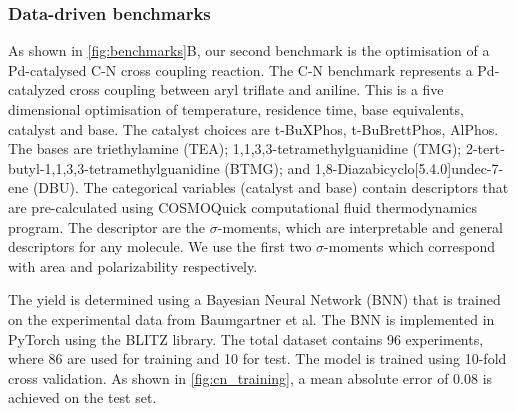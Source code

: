 
 
\subsubsection{Data-driven benchmarks}


As shown in \ref{fig:benchmarks}B, our second benchmark is the optimisation of a Pd-catalysed C-N cross coupling reaction. The C-N benchmark represents a Pd-catalyzed cross coupling between aryl triflate and aniline.\cite{Baumgartner2019} This is a five dimensional optimisation of temperature, residence time, base equivalents, catalyst and base. The catalyst choices are t-BuXPhos, t-BuBrettPhos, AlPhos. The bases are triethylamine (TEA); 1,1,3,3-tetramethylguanidine (TMG); 2-tert-butyl-1,1,3,3-tetramethylguanidine (BTMG); and 1,8-Diazabicyclo[5.4.0]undec-7-ene (DBU). The categorical variables (catalyst and base) contain descriptors that are pre-calculated using COSMOQuick computational fluid thermodynamics program.\cite{Loschen2012} The descriptor are the $\sigma$-moments, which are interpretable and general descriptors for any molecule.\cite{Zissimos2002} We use the first two $\sigma$-moments which correspond with area and polarizability respectively.

The yield is determined using a Bayesian Neural Network (BNN) that is trained on the experimental data from Baumgartner et al.\cite{Baumgartner2019} The BNN is implemented in PyTorch\cite{Paszke2019} using the BLITZ library.\cite{Esposito2020}  The total dataset contains 96 experiments, where 86 are used for training and 10 for test. The model is trained using 10-fold cross validation. As shown in \ref{fig:cn_training}, a mean absolute error of 0.08 is achieved on the test set.


